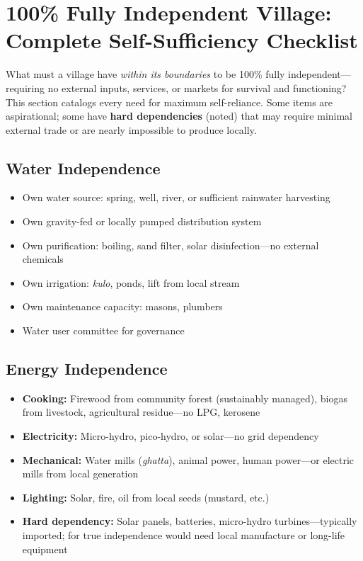\documentclass[11pt,a4paper]{article}
\begin{document}
\section{100\% Fully Independent Village: Complete Self-Sufficiency Checklist}

What must a village have \textit{within its boundaries} to be 100\% fully independent---requiring no external inputs, services, or markets for survival and functioning? This section catalogs every need for maximum self-reliance. Some items are aspirational; some have \textbf{hard dependencies} (noted) that may require minimal external trade or are nearly impossible to produce locally.

\subsection{Water Independence}
\begin{itemize}
    \item Own water source: spring, well, river, or sufficient rainwater harvesting
    \item Own gravity-fed or locally pumped distribution system
    \item Own purification: boiling, sand filter, solar disinfection---no external chemicals
    \item Own irrigation: \textit{kulo}, ponds, lift from local stream
    \item Own maintenance capacity: masons, plumbers
    \item Water user committee for governance
\end{itemize}

\subsection{Energy Independence}
\begin{itemize}
    \item \textbf{Cooking:} Firewood from community forest (sustainably managed), biogas from livestock, agricultural residue---no LPG, kerosene
    \item \textbf{Electricity:} Micro-hydro, pico-hydro, or solar---no grid dependency
    \item \textbf{Mechanical:} Water mills (\textit{ghatta}), animal power, human power---or electric mills from local generation
    \item \textbf{Lighting:} Solar, fire, oil from local seeds (mustard, etc.)
    \item \textbf{Hard dependency:} Solar panels, batteries, micro-hydro turbines---typically imported; for true independence would need local manufacture or long-life equipment
\end{itemize}
\end{document}
